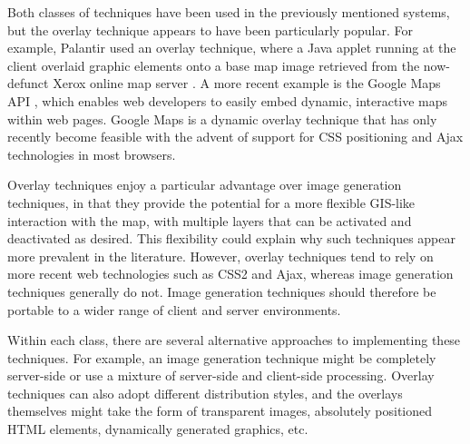 \documentclass[acmtocl,acmnow]{acmtrans2m}
\begin{document}
Both classes of techniques have been used in the previously mentioned
systems, but the overlay technique appears to have been particularly
popular. For example, Palantir used an overlay technique, where a Java
applet running at the client overlaid graphic elements onto a base map
image retrieved from the now-defunct Xerox online map server
\cite{Papa-N-1998-Palantir}. A more recent example is the Google Maps
API \cite{Goog-M-2006-maps}, which enables web developers to easily
embed dynamic, interactive maps within web pages. Google Maps is a
dynamic overlay technique that has only recently become feasible with the
advent of support for CSS positioning and Ajax technologies in most
browsers.

Overlay techniques enjoy a particular advantage over image generation
techniques, in that they provide the potential for a more flexible GIS-like
interaction with the map, with multiple layers that can be activated and
deactivated as desired. This flexibility could explain why such techniques
appear more prevalent in the literature. However, overlay techniques tend
to rely on more recent web technologies such as CSS2 and Ajax, whereas
image generation techniques generally do not. Image generation techniques
should therefore be portable to a wider range of client and server
environments.

Within each class, there are several alternative approaches to
implementing these techniques. For example, an image generation technique
might be completely server-side or use a mixture of server-side and
client-side processing. Overlay techniques can also adopt different
distribution styles, and the overlays themselves might take the form of
transparent images, absolutely positioned HTML elements, dynamically
generated graphics, etc.

% 
% 
% 
% 
% 
\end{document}
